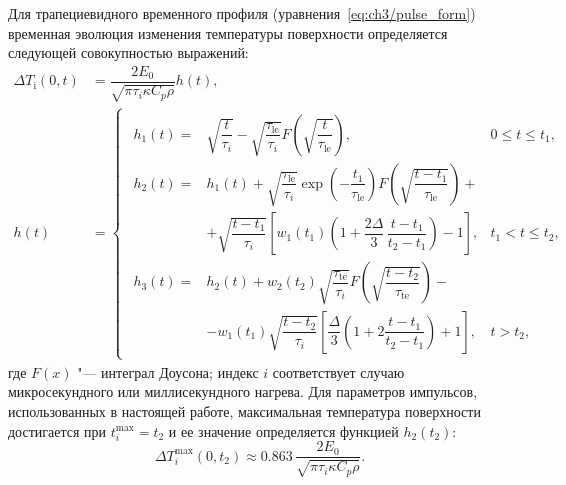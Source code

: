 Для трапециевидного временного профиля (уравнения~\cref{eq:ch3/pulse_form}) временная эволюция изменения температуры поверхности определяется следующей совокупностью выражений:
\begin{subequations}
    \label{eq:dT_usms}
    \begin{align}
        \Delta T_\mathrm{i}(0,t) & = \dfrac{2E_0}{\sqrt{\pi\tau_i \kappa C_p \rho}} h(t), \\
        h(t) & = 
        \begin{cases}
            \begin{alignedat}{3}
            h_1(t) = &\sqrt{\dfrac{t}{\tau_i}} - \sqrt{\dfrac{\tau_\mathrm{le}}{\tau_i}} F\left( \sqrt{\dfrac{t}{\tau_\mathrm{le}}} \right), & 0 \leq t \leq t_1, \\
            h_2(t) = &h_1(t) + \sqrt{\dfrac{\tau_\mathrm{le}}{\tau_i}} \exp \left( -\dfrac{t_1}{\tau_\mathrm{le}} \right) F\left( \sqrt{\dfrac{t-t_1}{\tau_\mathrm{le}}} \right) + &\\
            &+ \sqrt{\dfrac{t-t_1}{\tau_i}} \left[ w_1(t_1) \left( 1+\dfrac{2\Delta}{3}\, \dfrac{t-t_1}{t_2-t_1} \right) -1 \right], & t_1 < t \leq t_2, \\
            h_3(t) =& h_2(t) + w_2(t_2) \sqrt{\dfrac{\tau_\mathrm{te}}{\tau_i}} F\left( \sqrt{\dfrac{t-t_2}{\tau_\mathrm{te}}} \right) - & \\
            &- w_1(t_1) \sqrt{\dfrac{t-t_2}{\tau_i}} \left[ \dfrac{\Delta}{3} \left( 1 + 2 \dfrac{t-t_1}{t_2-t_1} \right) + 1 \right], & t>t_2, 
        \end{alignedat}
        \end{cases}
    \end{align}
\end{subequations}
где \( F(x) \) "--- интеграл Доусона; индекс \(i\) соответствует случаю микросекундного или миллисекундного нагрева. Для параметров импульсов, использованных в настоящей работе, максимальная температура поверхности достигается при \( t_i^{\max} = t_2 \) и ее значение определяется функцией \(h_2(t_2) \):
\begin{equation}
    \Delta T_i^{\max}(0,t_2) \approx \num{0.863} \, \frac{2E_0}{\sqrt{\pi \tau_i \kappa C_p \rho}}.
\end{equation}